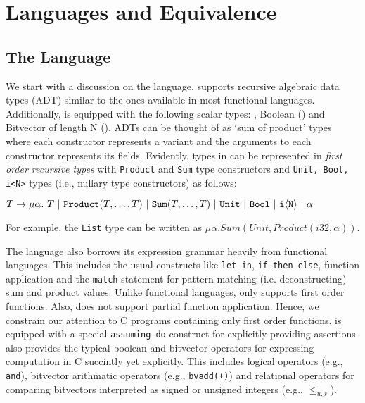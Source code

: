 \section{Languages and Equivalence}
\label{sec:lang-eqdef}

\subsection{The \SpecL{} Language}
\label{sec:speclang}
We start with a discussion on the \SpecL{} language.
\SpecL{} supports recursive algebraic data types (ADT) similar to the ones available in most functional languages.
Additionally, \SpecL{} is equipped with the following scalar types: , Boolean () and Bitvector of length N ().
ADTs can be thought of as `sum of product' types where each constructor represents a variant
and the arguments to each constructor represents its fields.
Evidently, types in \SpecL{} can be represented in {\em first order recursive types} with {\tt Product} and {\tt Sum} type constructors and {\tt Unit, Bool, i<N>} types (i.e., nullary type constructors) as follows:

$T \rightarrow {\tt \mu} \alpha.\ T \ |\  {\tt Product}(T,\dots,T) \ |\  {\tt Sum}(T,\dots,T) \ |\  {\tt Unit} \ |\ {\tt Bool} \ |\  {\tt i\langle N \rangle} \ |\  \alpha$

For example, the {\tt List} type can be written as $\mu \alpha. Sum(Unit, Product(i32,\alpha))$.

The language also borrows its expression grammar heavily from functional languages.
This includes the usual constructs like {\tt let-in}, {\tt if-then-else}, function application and the {\tt match} statement
for pattern-matching (i.e. deconstructing) sum and product values.
Unlike functional languages, \SpecL{} only supports first order functions.
Also, \SpecL{} does not support partial function application.
Hence, we constrain our attention to C programs containing only first order functions.
\SpecL{} is equipped with a special {\tt assuming-do} construct for explicitly providing assertions.
\SpecL{} also provides the typical boolean and bitvector operators for expressing computation in C succintly yet explicitly.
This includes logical operators (e.g., {\tt and}), bitvector arithmatic operators (e.g., {\tt bvadd(+)}) and
relational operators for comparing bitvectors interpreted as signed or unsigned integers (e.g., {\tt $\leq_{u,s}$}).



